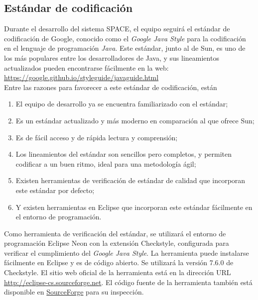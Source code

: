 \documentclass{scrreprt}
\begin{document}
\subsection{Estándar de codificación}

Durante el desarrollo del sistema SPACE, el equipo seguirá el estándar de codificación de Google, conocido como el \textit{Google Java Style} para la codificación en el lenguaje de programación \textit{Java}. Este estándar, junto al de Sun, es uno de los más populares entre los desarrolladores de Java, y sus lineamientos actualizados pueden encontrarse fácilmente en la web: \href{https://google.github.io/styleguide/javaguide.html}{https://google.github.io/styleguide/javaguide.html}\\

Entre las razones para favorecer a este estándar de codificación, están

\begin{enumerate}[label=\alph*.]
	\item El equipo de desarrollo ya se encuentra familiarizado con el estándar;
    \item Es un estándar actualizado y más moderno en comparación al que ofrece Sun;
    \item Es de fácil acceso y de rápida lectura y comprensión;
    \item Los lineamientos del estándar son sencillos pero completos, y permiten codificar a un buen ritmo, ideal para una metodología ágil;
    \item Existen herramientas de verificación de estándar de calidad que incorporan este estándar por defecto;
    \item Y existen herramientas en Eclipse que incorporan este estándar fácilmente en el entorno de programación.
\end{enumerate}

Como herramienta de verificación del estándar, se utilizará el entorno de programación Eclipse Neon con la extensión Checkstyle, configurada para verificar el cumplimiento del \textit{Google Java Style}. La herramienta puede instalarse fácilmente en Eclipse y es de código abierto. Se utilizará la versión 7.6.0 de Checkstyle. El sitio web oficial de la herramienta está en la dirección URL \href{http://eclipse-cs.sourceforge.net}{http://eclipse-cs.sourceforge.net}. El código fuente de la herramienta también está disponible en \href{https://sourceforge.net/p/eclipse-cs/git/ci/master/tree/}{SourceForge} para su inspección.\\
\end{document}
